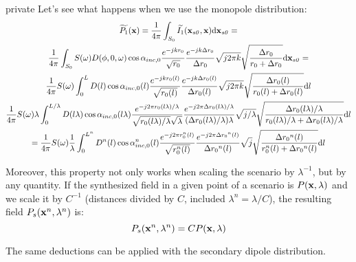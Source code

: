 \begin{shownto}{private}
Let's see what happens when we use the monopole distribution:
\begin{multline}
	\widetilde{P_1}(\PosTheo) = \frac{1}{4\pi} \int_{S_0} \widetilde{I_1}(\PosTheo[section], \PosTheo) \dif[{\PosTheo[section]}] = \\ \frac{1}{4\pi} \int_{S_0} S(\omega) \Diag(\azimuth, 0, \omega) \cos\normPrimaryPropAngleSection \frac{e^{-jk\distLinePrimSource}}{\sqrt{\distLinePrimSource}} \frac{e^{-jk\distLinePoint}}{\distLinePoint} \sqrt{j2\pi k} \sqrt{\frac{\distLinePoint}{\distLinePrimSource + \distLinePoint}} \dif[{\PosTheo[section]}] = \\
	\frac{1}{4\pi} S(\omega) \int_{0}^{L} \Diag(l) \cos\normPrimaryPropAngleSection(l) \frac{e^{-jk\distLinePrimSource(l)}}{\sqrt{\distLinePrimSource(l)}} \frac{e^{-jk\distLinePoint(l)}}{\distLinePoint(l)} \sqrt{j2\pi k} \sqrt{\frac{\distLinePoint(l)}{\distLinePrimSource(l) + \distLinePoint(l)}} \dif[l] \\
	\frac{1}{4\pi} S(\omega) \lambda \int_{0}^{L/\lambda} \Diag(l\lambda) \cos\normPrimaryPropAngleSection(l\lambda) \frac{e^{-j2\pi\distLinePrimSource(l\lambda)/\lambda}}{\sqrt{\distLinePrimSource(l\lambda)/\lambda}\sqrt{\lambda}}\frac{e^{-j2\pi\distLinePoint(l\lambda)/\lambda}}{(\distLinePoint(l\lambda)/\lambda)\lambda} \sqrt{j/\lambda} \sqrt{\frac{\distLinePoint(l\lambda)/\lambda}{\distLinePrimSource(l\lambda)/\lambda + \distLinePoint(l\lambda)/\lambda}} \dif[l]
	\\
	= \frac{1}{4\pi} S(\omega) \frac{1}{\lambda} \int_{0}^{L^{n}} \Diag^{n}(l) \cos\normPrimaryPropAngleSection^{n}(l) \frac{e^{-j2\pi\distLinePrimSource^{n}(l)}}{\sqrt{\distLinePrimSource^{n}(l)}} \frac{e^{-j2\pi\distLinePoint^{n}(l)}}{\distLinePoint^{n}(l)} \sqrt{j} \sqrt{\frac{\distLinePoint^{n}(l)}{\distLinePrimSource^{n}(l) + \distLinePoint^{n}(l)}} \dif[l] 
\end{multline}

Moreover, this property not only works when scaling the scenario by $\lambda^{-1}$, but by any quantity. If the synthesized field in a given point of a scenario is $P(\PosTheo, \lambda)$ and we scale it by $C^{-1}$ (distances divided by $C$, included $\lambda^{n} = \lambda/C$), the resulting field $P_{s}(\PosTheo^{n}, \lambda^{n})$ is:
\begin{equation}
P_s(\PosTheo^{n}, \lambda^{n}) = C P(\PosTheo, \lambda)
\end{equation}

The same deductions can be applied with the secondary dipole distribution.
\end{shownto}


